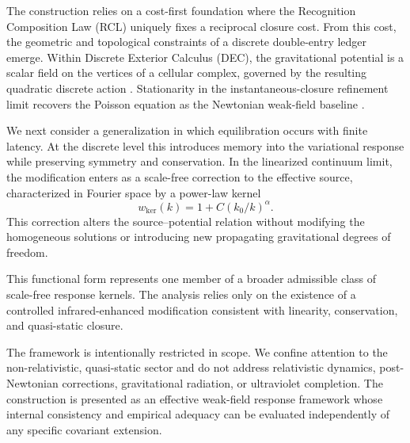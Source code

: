 \documentclass[entropy,article,submit,pdftex,moreauthors]{Definitions/mdpi}
\begin{document}
The construction relies on a cost-first foundation where the Recognition Composition Law (RCL) uniquely fixes a reciprocal closure cost. From this cost, the geometric and topological constraints of a discrete double-entry ledger emerge. Within Discrete Exterior Calculus (DEC), the gravitational potential is a scalar field on the vertices of a cellular complex, governed by the resulting quadratic discrete action \cite{bossavit1998,hirani2003,desbrun2005}. Stationarity in the instantaneous-closure refinement limit recovers the Poisson equation as the Newtonian weak-field baseline \cite{Misner_Thorne_Wheeler_1995,Wald_1984}.

We next consider a generalization in which equilibration occurs with finite latency. At the discrete level this introduces memory into the variational response while preserving symmetry and conservation. In the linearized continuum limit, the modification enters as a scale-free correction to the effective source, characterized in Fourier space by a power-law kernel
\begin{equation}
    w_{\mathrm{ker}}(k) = 1 + C(k_0/k)^{\alpha}.
\end{equation}
This correction alters the source–potential relation without modifying the homogeneous solutions or introducing new propagating gravitational degrees of freedom.

This functional form represents one member of a broader admissible class of scale-free response kernels. The analysis relies only on the existence of a controlled infrared-enhanced modification consistent with linearity, conservation, and quasi-static closure.

The framework is intentionally restricted in scope. We confine attention to the non-relativistic, quasi-static sector and do not address relativistic dynamics, post-Newtonian corrections, gravitational radiation, or ultraviolet completion. The construction is presented as an effective weak-field response framework whose internal consistency and empirical adequacy can be evaluated independently of any specific covariant extension.

\end{document}
